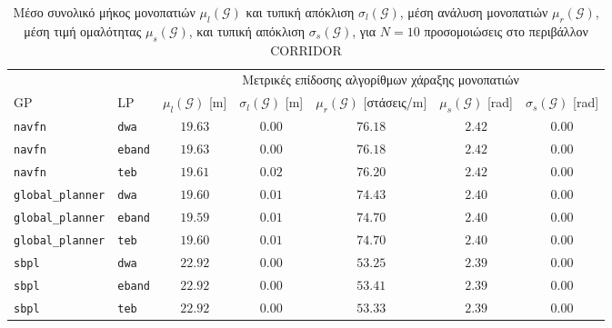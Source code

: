 \begin{table}[h]\hspace{-1cm}
\renewcommand{\arraystretch}{1.3}
\begin{tabular}{llccccc}
  & & \multicolumn{5}{c}{Μετρικές επίδοσης αλγορίθμων χάραξης μονοπατιών} \\
  \cline{3-7}
  GP & LP & $\mu_{l}(\bm{\mathcal{G}})$ [m] & $\sigma_{l}(\bm{\mathcal{G}})$ [m] & $\mu_r(\bm{\mathcal{G}})$ [στάσεις/m] & $\mu_{s}(\bm{\mathcal{G}})$ [rad] & $\sigma_{s}(\bm{\mathcal{G}})$ [rad] \\ \toprule
  \texttt{navfn} & \texttt{dwa} & $19.63$ & $0.00$ & $76.18$ & $2.42$ & $0.00$ \\
  \texttt{navfn} & \texttt{eband} & $19.63$ & $0.00$ & $76.18$ & $2.42$ & $0.00$ \\
  \texttt{navfn} & \texttt{teb} & $19.61$ & $0.02$ & $76.20$ & $2.42$ & $0.00$ \\
  \texttt{global\_planner} & \texttt{dwa} & $19.60$ & $0.01$ & $74.43$ & $2.40$ & $0.00$ \\
  \texttt{global\_planner} & \texttt{eband} & $19.59$ & $0.01$ & $74.70$ & $2.40$ & $0.00$ \\
  \texttt{global\_planner} & \texttt{teb} & $19.60$ & $0.01$ & $74.70$ & $2.40$ & $0.00$ \\
  \texttt{sbpl} & \texttt{dwa} & $22.92$ & $0.00$ & $53.25$ & $2.39$ & $0.00$ \\
  \texttt{sbpl} & \texttt{eband} & $22.92$ & $0.00$ & $53.41$ & $2.39$ & $0.00$ \\
  \texttt{sbpl} & \texttt{teb} & $22.92$ & $0.00$ & $53.33$ & $2.39$ & $0.00$ \\ \bottomrule
\end{tabular}
\caption{\small Μέσο συνολικό μήκος μονοπατιών $\mu_{l}(\bm{\mathcal{G}})$ και
         τυπική απόκλιση $\sigma_{l}(\bm{\mathcal{G}})$, μέση ανάλυση
         μονοπατιών $\mu_r(\bm{\mathcal{G}})$, μέση τιμή ομαλότητας
         $\mu_{s}(\bm{\mathcal{G}})$, και τυπική απόκλιση
         $\sigma_{s}(\bm{\mathcal{G}})$, για $N=10$ προσομοιώσεις στο
         περιβάλλον CORRIDOR}
\label{tbl:info_global_plan_corridor}
\end{table}

